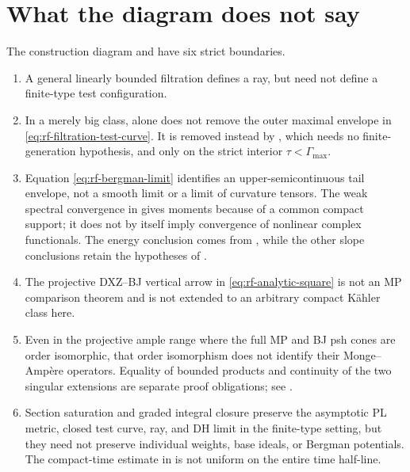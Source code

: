 \clearpage

\section{What the diagram does not say}
\label{sec:rf-comparison-boundaries}

The construction diagram and  have six strict boundaries.

\begin{enumerate}
\item A general linearly bounded filtration defines a ray, but need not
define a finite-type test configuration.

\item In a merely big class, \cite[Proposition~7.11]{RWN14} alone does not
remove the outer maximal envelope in
\eqref{eq:rf-filtration-test-curve}.  It is removed instead by
, which needs no finite-generation
hypothesis, and only on the strict interior $\tau<\Gamma_{\max}$.

\item Equation \eqref{eq:rf-bergman-limit} identifies an upper-semicontinuous tail envelope, not a smooth limit or a limit of curvature tensors.  The weak spectral convergence in  gives moments because of a common compact support; it does not by itself imply convergence of nonlinear complex functionals.  The energy conclusion comes from , while the other slope conclusions retain the hypotheses of .

\item The projective DXZ--BJ vertical arrow in
\eqref{eq:rf-analytic-square} is not an MP comparison theorem and is not
extended to an arbitrary compact K\"ahler class here.

\item Even in the projective ample range where the full MP and BJ psh cones are order isomorphic, that order isomorphism does not identify their Monge--Amp\`ere operators.  Equality of bounded products and continuity of the two singular extensions are separate proof obligations; see .

\item Section saturation and graded integral closure preserve the asymptotic PL metric, closed test curve, ray, and DH limit in the finite-type setting, but they need not preserve individual weights, base ideals, or Bergman potentials.  The compact-time estimate in  is not uniform on the entire time half-line.
\end{enumerate}

